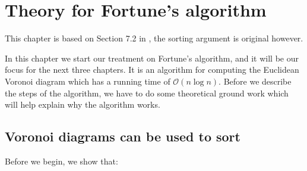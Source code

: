 \chapter{Theory for Fortune's algorithm}

This chapter is based on Section 7.2 in \cite{CompGeo}, the sorting argument is original however.

In this chapter we start our treatment on Fortune's algorithm, and it will be our focus for the next three chapters. It is an algorithm for computing the Euclidean Voronoi diagram which has a running time of $\mathcal{O}(n \log n)$. Before we describe the steps of the algorithm, we have to do some theoretical ground work which will help explain why the algorithm works.

\section{Voronoi diagrams can be used to sort}
Before we begin, we show that:

